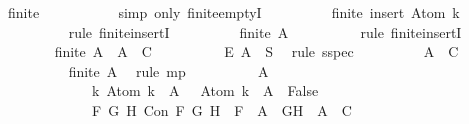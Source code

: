 \begin{isabellebody}
\ {\isachardoublequoteopen}finite\ {\isacharbraceleft}{\isacharbraceright}{\isachardoublequoteclose}\isanewline
\ \ \ \ \ \ \ \ \isamarkupfalse%
\ {\isacharparenleft}simp\ only{\isacharcolon}\ finite{\isachardot}emptyI{\isacharparenright}\isanewline
\ \ \ \ \ \ \isamarkupfalse%
\ \isamarkupfalse%
\ {\isachardoublequoteopen}finite\ {\isacharparenleft}insert\ {\isacharparenleft}\isactrlbold {\isasymnot}{\isacharparenleft}Atom\ k{\isacharparenright}{\isacharparenright}\ {\isacharbraceleft}{\isacharbraceright}{\isacharparenright}{\isachardoublequoteclose}\isanewline
\ \ \ \ \ \ \ \ \isamarkupfalse%
\ {\isacharparenleft}rule\ finite{\isachardot}insertI{\isacharparenright}\isanewline
\ \ \ \ \ \ \isamarkupfalse%
\ \isamarkupfalse%
\ {\isachardoublequoteopen}finite\ {\isacharquery}A{\isachardoublequoteclose}\isanewline
\ \ \ \ \ \ \ \ \isamarkupfalse%
\ {\isacharparenleft}rule\ finite{\isachardot}insertI{\isacharparenright}\isanewline
\ \ \ \ \ \ \isamarkupfalse%
\ {\isachardoublequoteopen}finite\ {\isacharquery}A\ {\isasymlongrightarrow}\ {\isacharquery}A\ {\isasymin}\ C{\isachardoublequoteclose}\isanewline
\ \ \ \ \ \ \ \ \isamarkupfalse%
\ E\ {\isacartoucheopen}{\isacharquery}A\ {\isasymsubseteq}\ S{\isacartoucheclose}\ \isamarkupfalse%
\ {\isacharparenleft}rule\ sspec{\isacharparenright}\isanewline
\ \ \ \ \ \ \isamarkupfalse%
\ \isamarkupfalse%
\ {\isachardoublequoteopen}{\isacharquery}A\ {\isasymin}\ C{\isachardoublequoteclose}\isanewline
\ \ \ \ \ \ \ \ \isamarkupfalse%
\ {\isacartoucheopen}finite\ {\isacharquery}A{\isacartoucheclose}\ \isamarkupfalse%
\ {\isacharparenleft}rule\ mp{\isacharparenright}\isanewline
\ \ \ \ \ \ \isamarkupfalse%
\ {\isachardoublequoteopen}{\isasymbottom}\ {\isasymnotin}\ {\isacharquery}A\isanewline
\ \ \ \ \ \ \ \ \ \ \ \ {\isasymand}\ {\isacharparenleft}{\isasymforall}k{\isachardot}\ Atom\ k\ {\isasymin}\ {\isacharquery}A\ {\isasymlongrightarrow}\ \isactrlbold {\isasymnot}\ {\isacharparenleft}Atom\ k{\isacharparenright}\ {\isasymin}\ {\isacharquery}A\ {\isasymlongrightarrow}\ False{\isacharparenright}\isanewline
\ \ \ \ \ \ \ \ \ \ \ \ {\isasymand}\ {\isacharparenleft}{\isasymforall}F\ G\ H{\isachardot}\ Con\ F\ G\ H\ {\isasymlongrightarrow}\ F\ {\isasymin}\ {\isacharquery}A\ {\isasymlongrightarrow}\ {\isacharbraceleft}G{\isacharcomma}H{\isacharbraceright}\ {\isasymunion}\ {\isacharquery}A\ {\isasymin}\ C{\isacharparenright}\isanewline

\end{isabellebody}
